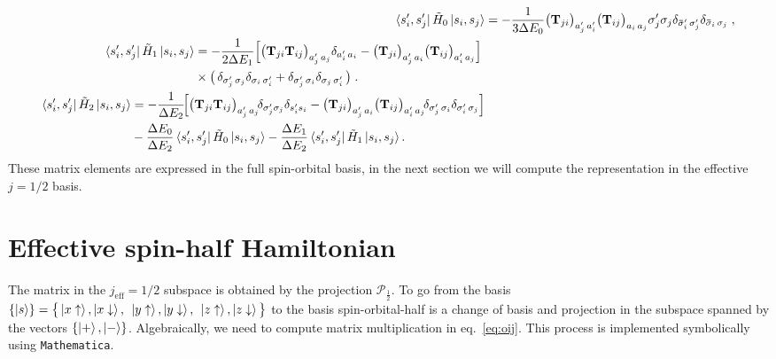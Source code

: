 \begin{align}
     \bra{s_i', s_j'} \tilde{ { H } }_0  \ket{s_i, s_j}
    &= -   \frac{1}{3 \Delta E_0}
    \big({\mathbf{T}}_{ji} \big)_{a_j'\,a_i'} \big(  {\mathbf{T}}_{ij}\big)_{a_i\,a_j} \sigma_j'\sigma_j      \delta_{\bar\sigma_i'\, \sigma_j'}
    \delta_{\bar\sigma_i\,\sigma_j}
    \; , \\
    \begin{split}
    \bra{s_i', s_j'} \tilde{ { H } }_1  \ket{s_i, s_j}
    &= -   \frac{1}{2 \Delta E_1} \Big[
    \big({\mathbf{T}}_{ji}   {\mathbf{T}}_{ij}\big)_{a_j'\,a_j}  \delta_{a_i'\,a_i}
    - \big({\mathbf{T}}_{ji} \big)_{a_j'\,a_i} \big(  {\mathbf{T}}_{ij}\big)_{a_i'\,a_j} \Big] \;\\ &\times  \big( \,
      \delta_{\sigma_j'\, \sigma_j}  \delta_{\sigma_i\,\sigma_i'}  +
      \delta_{\sigma_j'\, \sigma_i}  \delta_{\sigma_j\,\sigma_i'} \,\big)  \; .
    \end{split}\\
    \begin{split}
        \bra{s_i', s_j'} \tilde{ { H } }_2  \ket{s_i, s_j}
      &= -
      \frac{1}{\Delta E_2} \!      \Big[
       \big({\mathbf{T}}_{ji}  {\mathbf{T}}_{ij}\big)_{a_j'\,a_j}\!\delta_{\sigma_j'\sigma_j} \delta_{s_i' s_i}       -
      \big({\mathbf{T}}_{ji} \big)_{a_j'\,a_i}\big(  {\mathbf{T}}_{ij}\big)_{a_i'\,a_j}\!\delta_{\sigma_j'\,\sigma_i} \delta_{\sigma_i'\,\sigma_j}        \Big]      \\
      & -
      \frac{\Delta E_0}{\Delta E_2} \bra{s_i', s_j'} \tilde{ { H } }_0  \ket{s_i, s_j}
      -
      \frac{\Delta E_1}{\Delta E_2} \bra{s_i', s_j'} \tilde{ { H } }_1  \ket{s_i, s_j}            .
    \end{split}
\end{align}
These matrix elements are expressed in the full spin-orbital basis, in the next section we will compute the representation in the effective $j=1/2$ basis.


\section{Effective spin-half Hamiltonian}


The matrix in the $j_{\text{eff}}=1/2$ subspace is obtained by the projection $\mathcal{P}_{\frac{1}{2}}$.
To go from the basis $\{ \ket{s} \} =\big\{ \ket{x\uparrow},  \ket{x\downarrow}, \; \,\ket{y\uparrow},  \ket{y\downarrow}, \; \,\ket{z\uparrow},  \ket{z\downarrow} \big\}$ to the basis spin-orbital-half is a change of basis and projection in the subspace spanned by the vectors $\{\ket{+},\ket{-}\}$. Algebraically, we need to compute matrix multiplication in eq.~\eqref{eq:oij}. This process is implemented symbolically using \texttt{Mathematica}.

